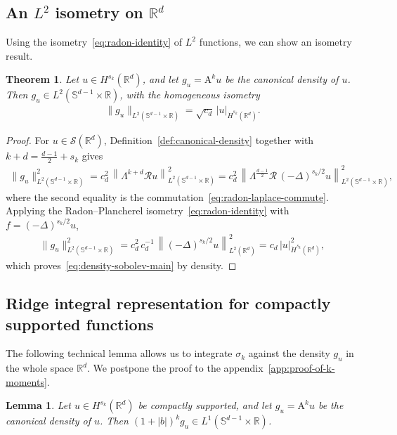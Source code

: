 \documentclass[12pt]{article}
\numberwithin{equation}{section}
\newtheorem{theorem}{Theorem}[section]
\newtheorem{lemma}{Lemma}[section]
\numberwithin{figure}{section}
\numberwithin{equation}{section}
\newcommand{\R}{\mathbb{R}}
\newcommand{\Sph}{\mathbb S}
\newcommand{\norm}[1]{\left\|#1\right\|}
\begin{document}
\subsection{An \texorpdfstring{$L^2$}{L2} isometry on \texorpdfstring{$\R^d$}{Rd}}
Using the isometry~\eqref{eq:radon-identity} of $L^2$ functions, we can show an isometry 
result.
\begin{theorem}
\label{thm:density-sobolev}
Let $u\in H^{s_k}(\R^d)$, and let $g_u=\mathrm{A}^k  u$ be the canonical
density of $u$.
Then $g_u\in L^2(\Sph^{d-1}\times\R)$, with the homogeneous isometry
\begin{align}
    \|g_u\|_{L^2(\Sph^{d-1}\times\R)}
    =
    \sqrt{c_d}\,|u|_{\dot H^{s_k}(\R^d)}.
    \label{eq:density-sobolev-main}
\end{align}
\end{theorem}

\begin{proof}
For $u\in\mathcal S(\R^d)$, Definition~\ref{def:canonical-density} together with
$k+d=\frac{d-1}{2}+s_k$ gives
\begin{align*}
    \|g_u\|_{L^2(\Sph^{d-1}\times\R)}^2
    = c_d^2\,\norm{\Lambda^{k+d}\mathcal Ru}_{L^2(\Sph^{d-1}\times\R)}^2
    = c_d^2\,\norm{\Lambda^{\frac{d-1}{2}}\mathcal R\,(-\Delta)^{s_k/2}u}_{L^2(\Sph^{d-1}\times\R)}^2,
\end{align*}
where the second equality is the commutation~\eqref{eq:radon-laplace-commute}.
Applying the Radon--Plancherel isometry~\eqref{eq:radon-identity} with
$f=(-\Delta)^{s_k/2}u$,
\begin{align*}
    \|g_u\|_{L^2(\Sph^{d-1}\times\R)}^2
    = c_d^2\,c_d^{-1}\,\norm{(-\Delta)^{s_k/2}u}_{L^2(\R^d)}^2
    = c_d\,|u|_{\dot H^{s_k}(\R^d)}^2 ,
\end{align*}
which proves~\eqref{eq:density-sobolev-main} by density.
\end{proof}


\subsection{Ridge integral representation for compactly supported functions}
The following technical lemma allows us to integrate $\sigma_k$ against the
density $g_u$ in the whole space $\R^d$. We postpone the proof to the
appendix~\ref{app:proof-of-k-moments}.
\begin{lemma}
\label{lem:canonical-density-weighted-L1}
Let $u\in H^{s_k}(\R^d)$ be compactly supported, and let $g_u=\mathrm{A}^k  u$ be
the canonical density of $u$. Then $(1+|b|)^k g_u\in L^1(\Sph^{d-1}\times\R)$.
\end{lemma}
\end{document}
